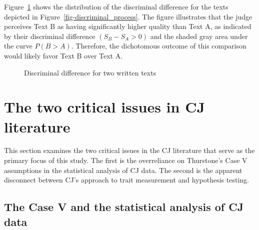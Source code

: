 \documentclass[
  authoryear,
  preprint,
  1p]{elsarticle}
\begin{document}
Figure~\ref{fig-discriminal_difference} shows the distribution of the
discriminal difference for the texts depicted in
Figure~\ref{fig-discriminal_process}. The figure illustrates that the
judge perceives Text B as having significantly higher quality than Text
A, as indicated by their discriminal difference \((S_{B} - S_{A} > 0)\)
and the shaded gray area under the curve \(P(B > A)\). Therefore, the
dichotomous outcome of this comparison would likely favor Text B over
Text A.

\begin{figure}


\caption{\label{fig-discriminal_difference}Discriminal difference for
two written texts}

\end{figure}%

\section{The two critical issues in CJ
literature}\label{sec-theory-issues}

This section examines the two critical issues in the CJ literature that
serve as the primary focus of this study. The first is the overreliance
on Thurstone's Case V assumptions in the statistical analysis of CJ
data. The second is the apparent disconnect between CJ's approach to
trait measurement and hypothesis testing.

\subsection{The Case V and the statistical analysis of CJ
data}\label{sec-theory-issue1}
\end{document}
